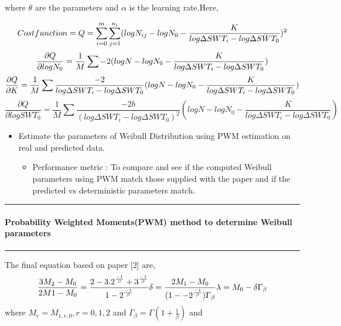\documentclass[11pt]{article}
\providecommand{\tightlist}{%
      \setlength{\itemsep}{0pt}\setlength{\parskip}{0pt}}
\begin{document}
where \(\theta\) are the parameters and \(\alpha\) is the learning
rate.Here,

\[
Cost function = Q = \sum_{i=0}^m\sum_{j=1}^{n_i}(logN_{ij} - logN_0 - \frac{K}{log\Delta SWT_i - log\Delta SWT_0})^2 \\
\] \[
\frac{\partial Q}{\partial logN_0} = \frac{1}{M}\sum -2(logN - logN_0 - \frac{K}{log\Delta SWT_i - log\Delta SWT_0}) \\
\] \[
\frac{\partial Q}{\partial K} = \frac{1}{M}\sum \frac{-2}{log\Delta SWT_i - log\Delta SWT_0}(logN - logN_0 - \frac{K}{log\Delta SWT_i - log\Delta SWT_0}) \\
\] \[
\frac{\partial Q}{\partial logSWT_0} = \frac{1}{M}\sum \frac{-2b}{(log\Delta SWT_i - log\Delta SWT_0)^2}(logN - logN_0 - \frac{K}{log\Delta SWT_i - log\Delta SWT_0})
\]

\begin{itemize}
\tightlist
\item
  Estimate the parameters of Weibull Distribution using PWM estimation
  on real and predicted data.

  \begin{itemize}
  \tightlist
  \item
    Performance metric : To compare and see if the computed Weibull
    parameters using PWM match those supplied with the paper and if the
    predicted vs deterministic parameters match.
  \end{itemize}
\end{itemize}

\begin{center}\rule{0.5\linewidth}{\linethickness}\end{center}

\hypertarget{probability-weighted-momentspwm-method-to-determine-weibull-parameters}{%
\paragraph{Probability Weighted Moments(PWM) method to determine Weibull
parameters}\label{probability-weighted-momentspwm-method-to-determine-weibull-parameters}}

\begin{center}\rule{0.5\linewidth}{\linethickness}\end{center}

The final equation based on paper {[}2{]} are, \[
\frac{3M_2 - M_0}{2M1 - M_0} = \frac{2 - 3.2^{\frac{-1}{\beta}} + 3^{\frac{-1}{\beta}}}{1 - 2^{\frac{-1}{\beta}}} \\
\delta = \frac{2M_1 - M_0}{(1-- 2^{\frac{-1}{\beta}})\Gamma_{\beta}} \\
\lambda = M_0 - \delta \Gamma_{\beta}
\] where \(M_r = M_{1,r,0},r = 0,1,2\) and
\(\Gamma_{\beta} = \Gamma(1 + \frac{1}{\beta})\) and
\end{document}
